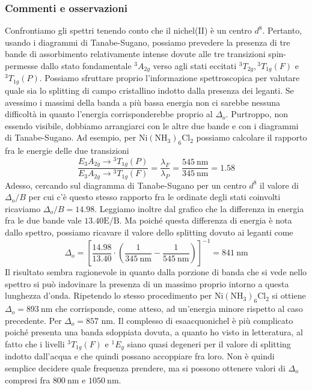 \subsubsection{Commenti e osservazioni}
Confrontiamo gli spettri tenendo conto che il nichel(II) è un centro $d^8$. Pertanto, usando i diagrammi di Tanabe-Sugano, possiamo prevedere la presenza di tre bande di assorbimento relativamente  intense dovute alle tre transizioni spin-permesse dallo stato fondamentale ${ }^3 A_{2 g}$ verso agli stati eccitati ${ }^3 T_{2 g},{ }^3 T_{1 g}(F)$ e ${ }^3 T_{1 g}(P)$. Possiamo sfruttare proprio l'informazione spettroscopica per valutare quale sia lo splitting di campo cristallino indotto dalla presenza dei leganti. Se avessimo i massimi della banda a più bassa energia non ci sarebbe nessuna difficoltà in quanto l'energia corrisponderebbe proprio al $\Delta_o$. Purtroppo, non essendo visibile, dobbiamo arrangiarci con le altre due bande e con i diagrammi di Tanabe-Sugano. Ad esempio, per $\mathrm{Ni}\left(\mathrm{NH}_3\right)_6 \mathrm{Cl}_2$ possiamo calcolare il rapporto fra le energie delle due transizioni
$$
\frac{E_3 A_{2 g} \rightarrow{ }^3 T_{1 g}(P)}{E_3 A_{2 g} \rightarrow{ }^3 T_{1 g}(F)}=\frac{\lambda_F}{\lambda_P}=\frac{545 \mathrm{~nm}}{345 \mathrm{~nm}}=1.58
$$
Adesso, cercando sul diagramma di Tanabe-Sugano per un centro $d^8$ il valore di $\Delta_o / B$ per cui c'è questo stesso rapporto fra le ordinate degli stati coinvolti ricaviamo $\Delta_o / B=14.98$. Leggiamo inoltre dal grafico che la differenza in energia fra le due bande vale $13.40 \mathrm{E} / \mathrm{B}$. Ma poiché questa differenza di energia è nota dallo spettro, possiamo ricavare il valore dello splitting dovuto ai leganti come
$$
\Delta_o=\left[\frac{14.98}{13.40} \cdot\left(\frac{1}{345 \mathrm{~nm}}-\frac{1}{545 \mathrm{~nm}}\right)\right]^{-1}=841 \mathrm{~nm}
$$
Il risultato sembra ragionevole in quanto dalla porzione di banda che si vede nello spettro si può indovinare la presenza di un massimo proprio intorno a questa lunghezza d'onda. Ripetendo lo stesso procedimento per $\mathrm{Ni}\left(\mathrm{NH}_3\right)_6 \mathrm{Cl}_2$ si ottiene $\Delta_o=893 \mathrm{~nm}$ che corrisponde, come atteso, ad un'energia minore rispetto al caso precedente. Per   $\Delta_o = 857 $ nm. Il complesso di esaacquonichel è più complicato poiché presenta una banda sdoppiata dovuta, a quanto ho visto in letteratura, al fatto che i livelli ${ }^3 T_{1 g}(F)$ e ${ }^1 E_g$ siano quasi degeneri per il valore di splitting indotto dall'acqua e che quindi possano accoppiare fra loro. Non è quindi semplice decidere quale frequenza prendere, ma si possono ottenere valori di $\Delta_o$ compresi fra $800 \mathrm{~nm}$ e $1050 \mathrm{~nm}$\cite{nicheluv}.



